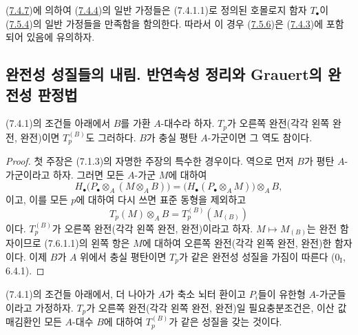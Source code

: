 \begin{remark}[7.5.7]
\label{III.7.5.7-fr}
(\hyperref[III.7.4.7-fr]{7.4.7})에 의하여
(\hyperref[III.7.4.4-fr]{7.4.4})의 일반 가정들은 (7.4.1.1)로 정의된
호몰로지 함자 $T_\bullet$이 (\hyperref[III.7.5.4-fr]{7.5.4})의 일반
가정들을 만족함을 함의한다. 따라서 이 경우
(\hyperref[III.7.5.6-fr]{7.5.6})은
(\hyperref[III.7.4.3-fr]{7.4.3})에 포함되어 있음에 유의하자.
\end{remark}

\subsection{완전성 성질들의 내림. 반연속성 정리와 Grauert의 완전성 판정법}
\label{subsection:III.7.6.fr}

\begin{proposition}[7.6.1]
\label{III.7.6.1-fr}
(7.4.1)의 조건들 아래에서 $B$를 가환 $A$-대수라 하자. $T_p$가 오른쪽
완전(각각 왼쪽 완전, 완전)이면 $T_p^{(B)}$도 그러하다. $B$가 충실
평탄 $A$-가군이면 그 역도 참이다.
\end{proposition}

\begin{proof}
첫 주장은 (7.1.3)의 자명한 주장의 특수한 경우이다. 역으로 먼저
$B$가 평탄 $A$-가군이라고 하자. 그러면 모든 $A$-가군 $M$에 대하여
\[
  H_\bullet\bigl(P_\bullet\otimes_A(M\otimes_A B)\bigr)
  =
  \bigl(H_\bullet(P_\bullet\otimes_A M)\bigr)\otimes_A B,
\]
이고, 이를 모든 $p$에 대하여 다시 쓰면 표준 동형을 제외하고
\[
  T_p(M)\otimes_A B
  =
  T_p^{(B)}(M_{(B)})
  \tag{7.6.1.1}\label{III.7.6.1.1.fr}
\]
이다. $T_p^{(B)}$가 오른쪽 완전(각각 왼쪽 완전, 완전)이라고 하자.
$M\mapsto M_{(B)}$는 완전 함자이므로 (7.6.1.1)의 왼쪽 항은 $M$에
대하여 오른쪽 완전(각각 왼쪽 완전, 완전)한 함자이다. 이제 $B$가
$A$ 위에서 충실 평탄이면 $T_p$가 같은 완전성 성질을 가짐이 따른다
($0_{\mathrm I}$, 6.4.1).
\end{proof}

\begin{proposition}[7.6.2]
\label{III.7.6.2-fr}
(7.4.1)의 조건들 아래에서, 더 나아가 $A$가 축소 뇌터 환이고 $P_i$들이
유한형 $A$-가군들이라고 가정하자. $T_p$가 오른쪽 완전(각각 왼쪽
완전, 완전)일 필요충분조건은, 이산 값매김환인 모든 $A$-대수 $B$에
대하여 $T_p^{(B)}$가 같은 성질을 갖는 것이다.
\end{proposition}

